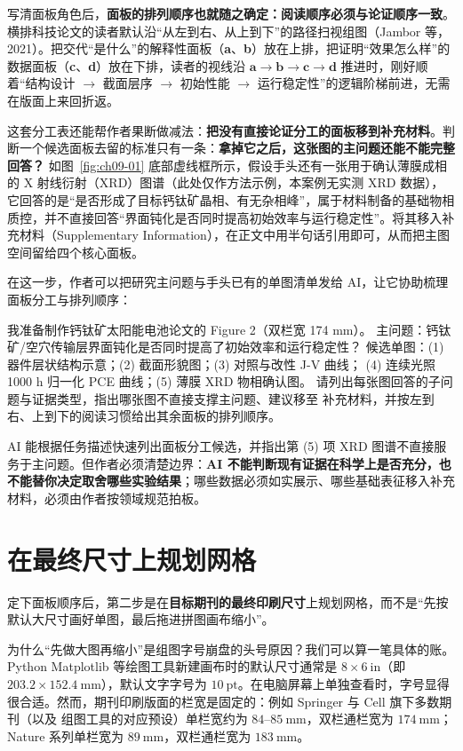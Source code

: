 写清面板角色后，\textbf{面板的排列顺序也就随之确定：阅读顺序必须与论证顺序一致}。横排科技论文的读者默认沿“从左到右、从上到下”的路径扫视组图（Jambor 等，2021）。把交代“是什么”的解释性面板（\textbf{a}、\textbf{b}）放在上排，把证明“效果怎么样”的数据面板（\textbf{c}、\textbf{d}）放在下排，读者的视线沿 $\textbf{a} \rightarrow \textbf{b} \rightarrow \textbf{c} \rightarrow \textbf{d}$ 推进时，刚好顺着“结构设计 $\rightarrow$ 截面层序 $\rightarrow$ 初始性能 $\rightarrow$ 运行稳定性”的逻辑阶梯前进，无需在版面上来回折返。

这套分工表还能帮作者果断做减法：\textbf{把没有直接论证分工的面板移到补充材料}。判断一个候选面板去留的标准只有一条：\textbf{拿掉它之后，这张图的主问题还能不能完整回答？} 如图~\ref{fig:ch09-01} 底部虚线框所示，假设手头还有一张用于确认薄膜成相的 X 射线衍射（XRD）图谱（此处仅作方法示例，本案例无实测 XRD 数据），它回答的是“是否形成了目标钙钛矿晶相、有无杂相峰”，属于材料制备的基础物相质控，并不直接回答“界面钝化是否同时提高初始效率与运行稳定性”。将其移入补充材料（Supplementary Information），在正文中用半句话引用即可，从而把主图空间留给四个核心面板。

在这一步，作者可以把研究主问题与手头已有的单图清单发给 AI，让它协助梳理面板分工与排列顺序：

\begin{Prompt}
我准备制作钙钛矿太阳能电池论文的 Figure 2（双栏宽 174 mm）。
主问题：钙钛矿/空穴传输层界面钝化是否同时提高了初始效率和运行稳定性？
候选单图：(1) 器件层状结构示意；(2) 截面形貌图；(3) 对照与改性 J-V 曲线；
(4) 连续光照 1000 h 归一化 PCE 曲线；(5) 薄膜 XRD 物相确认图。
请列出每张图回答的子问题与证据类型，指出哪张图不直接支撑主问题、建议移至
补充材料，并按左到右、上到下的阅读习惯给出其余面板的排列顺序。
\end{Prompt}

AI 能根据任务描述快速列出面板分工候选，并指出第 (5) 项 XRD 图谱不直接服务于主问题。但作者必须清楚边界：\textbf{AI 不能判断现有证据在科学上是否充分，也不能替你决定取舍哪些实验结果}；哪些数据必须如实展示、哪些基础表征移入补充材料，必须由作者按领域规范拍板。

\section{在最终尺寸上规划网格}

定下面板顺序后，第二步是在\textbf{目标期刊的最终印刷尺寸}上规划网格，而不是“先按默认大尺寸画好单图，最后拖进拼图画布缩小”。

为什么“先做大图再缩小”是组图字号崩盘的头号原因？我们可以算一笔具体的账。Python Matplotlib 等绘图工具新建画布时的默认尺寸通常是 $8 \times 6\ \text{in}$（即 $203.2 \times 152.4\ \text{mm}$），默认文字字号为 $10\ \text{pt}$。在电脑屏幕上单独查看时，字号显得很合适。然而，期刊印刷版面的栏宽是固定的：例如 Springer 与 Cell 旗下多数期刊（以及 \scidraw{} 组图工具的对应预设）单栏宽约为 $84\text{--}85\ \text{mm}$，双栏通栏宽为 $174\ \text{mm}$；Nature 系列单栏宽为 $89\ \text{mm}$，双栏通栏宽为 $183\ \text{mm}$。

